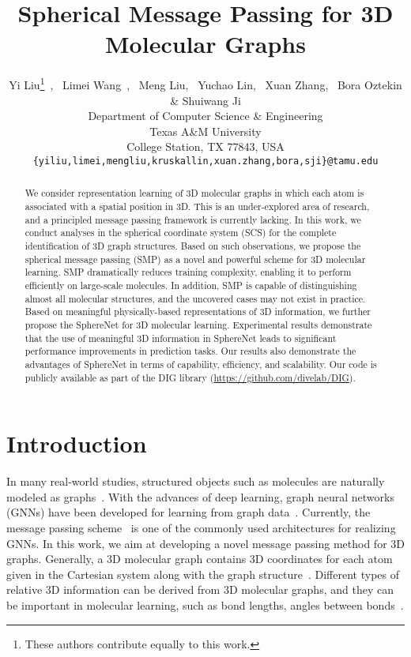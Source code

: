 \documentclass{article}
\title{Spherical Message Passing for 3D Molecular Graphs}
\author{Yi Liu\thanks{These authors contribute equally to this work.}\ , \ Limei Wang\footnotemark[1]\ , \ Meng Liu, \ Yuchao Lin, \ Xuan Zhang, \ Bora Oztekin \& Shuiwang Ji \\
Department of Computer Science \& Engineering\\
Texas A\&M University\\
College Station, TX 77843, USA\\
\texttt{\{yiliu,limei,mengliu,kruskallin,xuan.zhang,bora,sji\}@tamu.edu} \\
}
\begin{document}
\maketitle



\begin{abstract}



We consider representation learning of 3D molecular graphs in which each atom is associated with a spatial position in 3D.
This is an under-explored area of research, and a principled message passing framework is currently lacking.
In this work, we conduct analyses in the
spherical coordinate system (SCS) for the complete identification of 3D graph structures.
Based on such observations, we
propose the spherical message passing (SMP) as a novel
and powerful scheme for 3D molecular learning.
SMP dramatically reduces training complexity, enabling it to perform efficiently on large-scale molecules.
In addition, SMP is capable of distinguishing almost all molecular structures,
and the uncovered cases may not exist in practice.
Based on meaningful physically-based representations of 3D information, we further propose the SphereNet for 3D molecular learning.
Experimental results demonstrate that the use of meaningful 3D information in SphereNet leads to significant performance improvements in prediction tasks.
Our results also demonstrate the advantages of SphereNet in terms of capability, efficiency, and scalability.
Our code is publicly available
as part of the DIG library (\url{https://github.com/divelab/DIG}).
\end{abstract}


\section{Introduction}
In many real-world studies, structured objects
such as molecules are naturally modeled as 
graphs~\citep{gori2005new,wu2018moleculenet,shervashidze2011weisfeiler,fout2017protein,liu2020deep,wang2020advanced}.
With the advances of deep learning, graph neural networks (GNNs)
have been developed for learning from graph 
data~\citep{kipf2016semi,defferrard2016convolutional,velivckovic2017graph,zhang2018end,xu2018powerful,gao2019graph,Gao:KDD18,gao2020topology}.
Currently, the message passing scheme~\citep{gilmer2017neural,sanchez2020learning,vignac2020building,battaglia2018relational}
is one of the commonly used architectures for realizing GNNs.
In this work, we aim at developing a novel message passing method
for 3D graphs.
Generally, a 3D molecular graph contains 3D coordinates for each atom given in the 
Cartesian system
along with the graph structure~\citep{liu2018n,townshend2019end,axelrod2020geom}.
Different types of relative 3D information can be derived from 3D molecular graphs,
and they can be important in molecular learning, such as
bond lengths, angles between bonds~\citep{schutt2017schnet,klicpera_dimenet_2020}.
\end{document}
